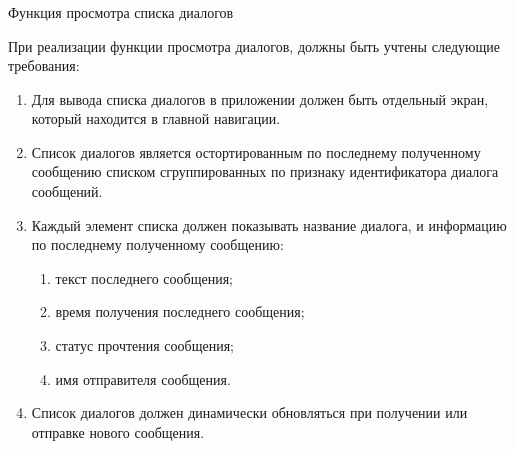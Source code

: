 \subsubsection{} Функция просмотра списка диалогов
\label{sec:analysis:research:funcreq:dialogueslist}

При реализации функции просмотра диалогов, должны быть учтены следующие требования:

\begin{enumerate}
	\item Для вывода списка диалогов в приложении должен быть отдельный экран, который находится в главной навигации.
	\item Список диалогов является остортированным по последнему полученному сообщению списком сгруппированных по признаку идентификатора диалога сообщений.
	\item Каждый элемент списка должен показывать название диалога, и информацию по последнему полученному сообщению:
	\begin{enumerate}
		\item текст последнего сообщения;
		\item время получения последнего сообщения;
		\item статус прочтения сообщения;
		\item имя отправителя сообщения.
	\end{enumerate}
	\item Список диалогов должен динамически обновляться при получении или отправке нового сообщения.
\end{enumerate}
